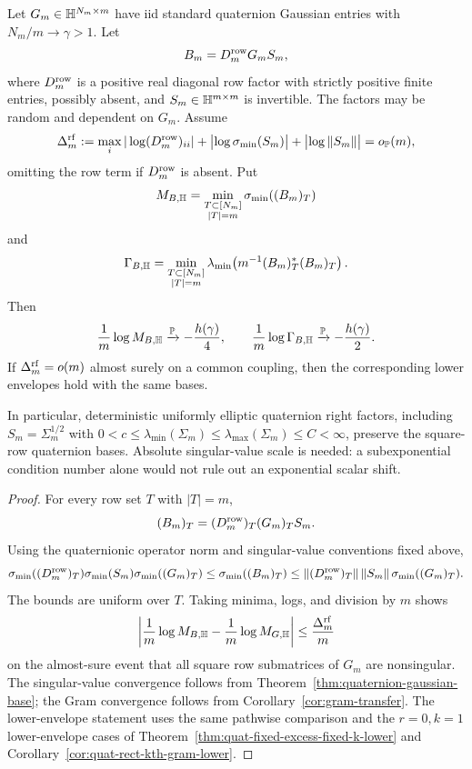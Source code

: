 \begin{corollary}\label{cor:quat-square-row-covariance-conditioning-exact}
Let \(G_m\in\mathbb{H}^{N_m\times m}\) have iid standard quaternion Gaussian entries
with \(N_m/m\to\gamma>1\).  Let
\[
  B_m=D_m^{\rm row}G_mS_m,
\]
where \(D_m^{\rm row}\) is a positive real diagonal row factor with strictly
positive finite entries, possibly absent, and \(S_m\in\mathbb{H}^{m\times m}\) is
invertible.  The factors may be random and dependent on \(G_m\).  Assume
\[
  \Delta_m^{\rm rf}:=
  \max_i|\log(D_m^{\rm row})_{ii}|
  +\bigl|\log\sigma_{\min}(S_m)\bigr|+\bigl|\log\|S_m\|\bigr|=o_{\mathbb{P}}(m),
\]
omitting the row term if \(D_m^{\rm row}\) is absent.  Put
\[
  M_{B,\mathbb{H}}=\min_{\substack{T\subset[N_m]\\ |T|=m}}\sigma_{\min}((B_m)_T)
\]
and
\[
  \Gamma_{B,\mathbb{H}}
  =
  \min_{\substack{T\subset[N_m]\\ |T|=m}}
  \lambda_{\min}\!\left(m^{-1}(B_m)_T^*(B_m)_T\right).
\]
Then
\[
  \frac1m\log M_{B,\mathbb{H}}
  \xrightarrow{\mathbb{P}}
  -\frac{h(\gamma)}4,
  \qquad
  \frac1m\log \Gamma_{B,\mathbb{H}}
  \xrightarrow{\mathbb{P}}
  -\frac{h(\gamma)}2 .
\]
If \(\Delta_m^{\rm rf}=o(m)\) almost surely on a common coupling, then the
corresponding lower envelopes hold with the same bases.

In particular, deterministic uniformly elliptic quaternion right factors,
including \(S_m=\Sigma_m^{1/2}\) with
\(0<c\le\lambda_{\min}(\Sigma_m)\le\lambda_{\max}(\Sigma_m)\le C<\infty\),
preserve the square-row quaternion bases.  Absolute singular-value scale is
needed: a subexponential condition number alone would not rule out an
exponential scalar shift.
\end{corollary}

\begin{proof}
For every row set \(T\) with \(|T|=m\),
\[
  (B_m)_T=(D_m^{\rm row})_T(G_m)_TS_m .
\]
Using the quaternionic operator norm and singular-value conventions fixed
above,
\[
  \sigma_{\min}((D_m^{\rm row})_T)\sigma_{\min}(S_m)\sigma_{\min}((G_m)_T)
  \le \sigma_{\min}((B_m)_T)
  \le \|(D_m^{\rm row})_T\|\,\|S_m\|\,\sigma_{\min}((G_m)_T).
\]
The bounds are uniform over \(T\).  Taking minima, logs, and division by \(m\)
shows
\[
  \left|
  \frac1m\log M_{B,\mathbb{H}}
  -\frac1m\log M_{G,\mathbb{H}}
  \right|
  \le \frac{\Delta_m^{\rm rf}}m
\]
on the almost-sure event that all square row submatrices of \(G_m\) are
nonsingular.  The singular-value convergence follows from
Theorem~\ref{thm:quaternion-gaussian-base}; the Gram convergence follows from
Corollary~\ref{cor:gram-transfer}.  The lower-envelope statement uses the same
pathwise comparison and the \(r=0,k=1\) lower-envelope cases of
Theorem~\ref{thm:quat-fixed-excess-fixed-k-lower} and
Corollary~\ref{cor:quat-rect-kth-gram-lower}.
\end{proof}

